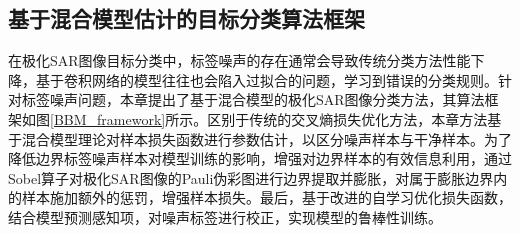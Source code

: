 

\subsection{基于混合模型估计的目标分类算法框架}


在极化SAR图像目标分类中，标签噪声的存在通常会导致传统分类方法性能下降，基于卷积网络的模型往往也会陷入过拟合的问题，学习到错误的分类规则。针对标签噪声问题，本章提出了基于混合模型的极化SAR图像分类方法，其算法框架如图\ref{BBM_framework}所示。区别于传统的交叉熵损失优化方法，本章方法基于混合模型理论对样本损失函数进行参数估计，以区分噪声样本与干净样本。为了降低边界标签噪声样本对模型训练的影响，增强对边界样本的有效信息利用，通过Sobel算子对极化SAR图像的Pauli伪彩图进行边界提取并膨胀，对属于膨胀边界内的样本施加额外的惩罚，增强样本损失。最后，基于改进的自学习优化损失函数，结合模型预测感知项，对噪声标签进行校正，实现模型的鲁棒性训练。

